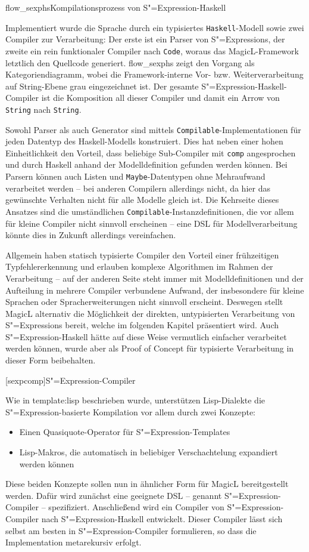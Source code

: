 \documentclass[12pt, a4paper, bibgerm]{scrbook}
\newcommand\icode[1]{\lstinline?#1?}
\newcommand\lchapter{}
\newcommand\sref{}
\newcommand\abb{}
\newcommand\fig{}
\newcommand{\sexp}{S"=Expression}
\newcommand{\sexps}{S"=Expressions}
\begin{document}
\fig{flow_sexphs}{Kompilationsprozess von \sexp{}-Haskell}

Implementiert wurde die Sprache durch ein typisiertes
\icode{Haskell}-Modell sowie zwei Compiler zur Verarbeitung: Der erste
ist ein Parser von \sexps{}, der zweite ein rein funktionaler Compiler
nach \icode{Code}, woraus das MagicL-Framework letztlich den Quellcode
generiert. \abb{flow_sexphs} zeigt den Vorgang als Kategoriendiagramm,
wobei die Framework-interne Vor- bzw. Weiterverarbeitung auf
String-Ebene grau eingezeichnet ist. Der gesamte
\sexp{}-Haskell-Compiler ist die Komposition all dieser Compiler und
damit ein Arrow von \icode{String} nach \icode{String}.

Sowohl Parser als auch Generator sind mittels
\icode{Compilable}-Implementationen für jeden Datentyp des
Haskell-Modells konstruiert. Dies hat neben einer hohen Einheitlichkeit
den Vorteil, dass beliebige Sub-Compiler mit \icode{comp} angesprochen
und durch Haskell anhand der Modelldefinition gefunden werden
können. Bei Parsern können auch Listen und \icode{Maybe}-Datentypen ohne
Mehraufwand verarbeitet werden -- bei anderen Compilern allerdings nicht,
da hier das gewünschte Verhalten nicht für alle Modelle gleich ist. Die
Kehrseite dieses Ansatzes sind die umständlichen
\icode{Compilable}-Instanzdefinitionen, die vor allem für kleine
Compiler nicht sinnvoll erscheinen -- eine DSL für Modellverarbeitung
könnte dies in Zukunft allerdings vereinfachen.

Allgemein haben statisch typisierte Compiler den Vorteil einer
frühzeitigen Typfehlererkennung und erlauben komplexe Algorithmen im
Rahmen der Verarbeitung -- auf der anderen Seite steht immer mit
Modelldefinitionen und der Aufteilung in mehrere Compiler verbundene
Aufwand, der insbesondere für kleine Sprachen oder Spracherweiterungen
nicht sinnvoll erscheint. Deswegen stellt MagicL alternativ die
Möglichkeit der direkten, untypisierten Verarbeitung von \sexps{}
bereit, welche im folgenden Kapitel präsentiert wird. Auch
\sexp{}-Haskell hätte auf diese Weise vermutlich einfacher verarbeitet
werden können, wurde aber als Proof of Concept für typisierte
Verarbeitung in dieser Form beibehalten.

\lchapter[sexpcomp]{\sexp{}-Compiler}

Wie in \sref{template:lisp} beschrieben wurde, unterstützen
Lisp-Dialekte die \sexp{}-basierte Kompilation vor allem durch zwei
Konzepte: 
\begin{itemize}
\item Einen Quasiquote-Operator für \sexp{}-Templates
\item Lisp-Makros, die automatisch in beliebiger Verschachtelung
  expandiert werden können
\end{itemize}
Diese beiden Konzepte sollen nun in ähnlicher Form für MagicL
bereitgestellt werden. Dafür wird zunächst eine geeignete DSL -- genannt
\sexp{}-Compiler -- spezifiziert. Anschließend wird ein Compiler von
\sexp{}-Compiler nach \sexp{}-Haskell entwickelt. Dieser Compiler lässt
sich selbst am besten in \sexp{}-Compiler formulieren, so dass die
Implementation metarekursiv erfolgt.
\end{document}
